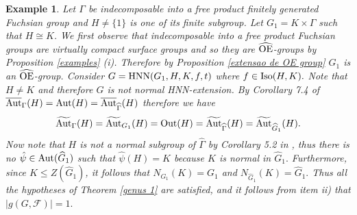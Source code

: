 \documentclass[a4paper,12pt]{article}
\newcommand{\Oe}{\rm \widehat{OE}}
\def\aut {{\rm Aut}}
\def\out {{\rm Out}}
\def\hnn {{\rm HNN}}
\def\Iso {{\rm Iso}}
\newtheorem{exa}[thm]{Example}
\begin{document}
{\begin{exa}\label{grupo fuchsian}  Let $\Gamma$ be indecomposable into a free product finitely generated Fuchsian group and $H \neq \{1\}$ is one of its finite subgroup. Let $G_1=K\times \Gamma$ such that $H \cong K$. We first observe that indecomposable into a free product Fuchsian groups are virtually compact surface groups and so they are $\Oe$-groups by Proposition \ref{examples} (i). Therefore by Proposition \ref{extensao de OE group} $G_1$ is an $\Oe$-group. Consider $G=\hnn(G_1,H, K, f, t)$ where $f\in \Iso(H, K).$ Note that $H \neq K$ and therefore $G$ is not normal HNN-extension. By Corollary 7.4 of \cite{BPZ2}  $\overline{\aut}_{\Gamma}(H)= \aut(H)=\overline{\aut}_{\widehat \Gamma}(H)$ therefore we have $$\widetilde{\aut}_{\Gamma}(H)=\widetilde{\aut}_{G_1}(H)= \out(H)=\widetilde{\aut}_{\widehat \Gamma}(H)=\widetilde{\aut}_{\widehat G_1}(H).$$ Now note that $H$ is not a normal subgroup of $\widehat \Gamma$ by Corollary 5.2 in \cite{BCR16}, thus there is no $\hat \psi \in \aut(\widehat G_1)$ such that $\hat \psi(H)=K$ because $K$ is normal in $\widehat G_1.$ Furthermore, since $K \leq Z(\widehat G_1)$, it follows that $N_{G_1}(K)=G_1$ and $N_{\widehat G_1}(K)=\widehat G_1.$ Thus all the hypotheses of Theorem \ref{genus 1} are satisfied, and it follows from item ii) that $|g(G, \mathcal{F})|=1.$ 


\end{exa}



}
\end{document}
